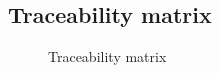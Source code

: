 \begin{landscape}
\thispagestyle{empty} 
\chapter{Traceability matrix} \label{sec:traceability}

\begin{figure}[H]
\begin{center}
\resizebox{\linewidth}{!}{}
\caption{Traceability matrix}
\label{fig:traceability}
\end{center}
\end{figure}
\end{landscape}
\restoregeometry